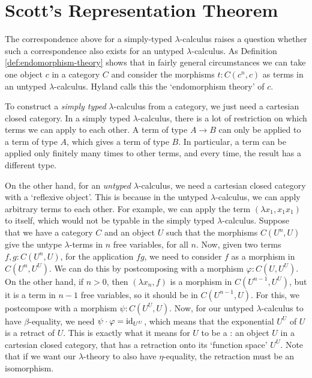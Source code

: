 \section{Scott's Representation Theorem}
The correspondence above for a simply-typed $ \lambda $-calculus raises a question whether such a correspondence also exists for an untyped $ \lambda $-calculus. As Definition \ref{def:endomorphism-theory} shows that in fairly general circumstances we can take one object $ c $ in a category $ C $ and consider the morphisms $ t: C(c^n, c) $ as terms in an untyped $ \lambda $-calculus. Hyland calls this the `endomorphism theory' of $ c $.

\begin{remark}
  To construct a \textit{simply typed} $ \lambda $-calculus from a category, we just need a cartesian closed category. In a simply typed $ \lambda $-calculus, there is a lot of restriction on which terms we can apply to each other. A term of type $ A \to B $ can only be applied to a term of type $ A $, which gives a term of type $ B $. In particular, a term can be applied only finitely many times to other terms, and every time, the result has a different type.

  On the other hand, for an \textit{untyped} $ \lambda $-calculus, we need a cartesian closed category with a `reflexive object'. This is because in the untyped $ \lambda $-calculus, we can apply arbitrary terms to each other. For example, we can apply the term $ (\lambda x_1, x_1 x_1) $ to itself, which would not be typable in the simply typed $ \lambda $-calculus. Suppose that we have a category $ C $ and an object $ U $ such that the morphisms $ C(U^n, U) $ give the untype $ \lambda $-terms in $ n $ free variables, for all $ n $. Now, given two terms $ f, g : C(U^n, U) $, for the application $ f g $, we need to consider $ f $ as a morphism in $ C(U^n, U^U) $. We can do this by postcomposing with a morphism $ \varphi: C(U, U^U) $. On the other hand, if $ n > 0 $, then $ (\lambda x_n, f) $ is a morphism in $ C(U^{n - 1}, U^U) $, but it is a term in $ n - 1 $ free variables, so it should be in $ C(U^{n - 1}, U) $. For this, we postcompose with a morphism $ \psi: C(U^U, U) $. Now, for our untyped $ \lambda $-calculus to have $ \beta $-equality, we need $ \psi \cdot \varphi = \text{id}_{U^U} $, which means that the exponential $ U^U $ of $ U $ is a retract of $ U $. This is exactly what it means for $ U $ to be a : an object $ U $ in a cartesian closed category, that has a retraction onto its `function space' $ U^U $. Note that if we want our $ \lambda $-theory to also have $ \eta $-equality, the retraction must be an isomorphism.


\end{remark}
